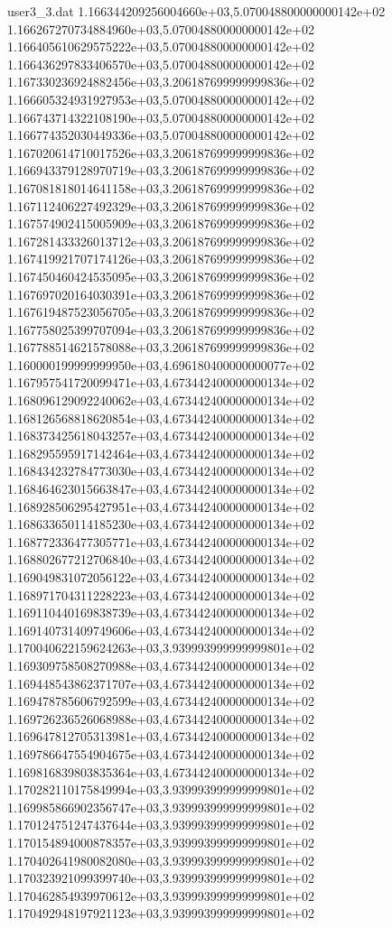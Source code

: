 \begin{filecontents}{user3_3.dat}
1.166344209256004660e+03,5.070048800000000142e+02
1.166267270734884960e+03,5.070048800000000142e+02
1.166405610629575222e+03,5.070048800000000142e+02
1.166436297833406570e+03,5.070048800000000142e+02
1.167330236924882456e+03,3.206187699999999836e+02
1.166605324931927953e+03,5.070048800000000142e+02
1.166743714322108190e+03,5.070048800000000142e+02
1.166774352030449336e+03,5.070048800000000142e+02
1.167020614710017526e+03,3.206187699999999836e+02
1.166943379128970719e+03,3.206187699999999836e+02
1.167081818014641158e+03,3.206187699999999836e+02
1.167112406227492329e+03,3.206187699999999836e+02
1.167574902415005909e+03,3.206187699999999836e+02
1.167281433326013712e+03,3.206187699999999836e+02
1.167419921707174126e+03,3.206187699999999836e+02
1.167450460424535095e+03,3.206187699999999836e+02
1.167697020164030391e+03,3.206187699999999836e+02
1.167619487523056705e+03,3.206187699999999836e+02
1.167758025399707094e+03,3.206187699999999836e+02
1.167788514621578088e+03,3.206187699999999836e+02
1.160000199999999950e+03,4.696180400000000077e+02
1.167957541720099471e+03,4.673442400000000134e+02
1.168096129092240062e+03,4.673442400000000134e+02
1.168126568818620854e+03,4.673442400000000134e+02
1.168373425618043257e+03,4.673442400000000134e+02
1.168295595917142464e+03,4.673442400000000134e+02
1.168434232784773030e+03,4.673442400000000134e+02
1.168464623015663847e+03,4.673442400000000134e+02
1.168928506295427951e+03,4.673442400000000134e+02
1.168633650114185230e+03,4.673442400000000134e+02
1.168772336477305771e+03,4.673442400000000134e+02
1.168802677212706840e+03,4.673442400000000134e+02
1.169049831072056122e+03,4.673442400000000134e+02
1.168971704311228223e+03,4.673442400000000134e+02
1.169110440169838739e+03,4.673442400000000134e+02
1.169140731409749606e+03,4.673442400000000134e+02
1.170040622159624263e+03,3.939993999999999801e+02
1.169309758508270988e+03,4.673442400000000134e+02
1.169448543862371707e+03,4.673442400000000134e+02
1.169478785606792599e+03,4.673442400000000134e+02
1.169726236526068988e+03,4.673442400000000134e+02
1.169647812705313981e+03,4.673442400000000134e+02
1.169786647554904675e+03,4.673442400000000134e+02
1.169816839803835364e+03,4.673442400000000134e+02
1.170282110175849994e+03,3.939993999999999801e+02
1.169985866902356747e+03,3.939993999999999801e+02
1.170124751247437644e+03,3.939993999999999801e+02
1.170154894000878357e+03,3.939993999999999801e+02
1.170402641980082080e+03,3.939993999999999801e+02
1.170323921099399740e+03,3.939993999999999801e+02
1.170462854939970612e+03,3.939993999999999801e+02
1.170492948197921123e+03,3.939993999999999801e+02

\end{filecontents}
